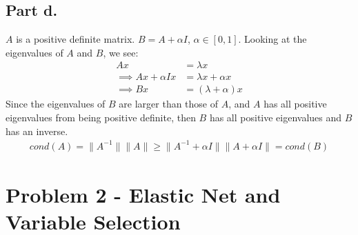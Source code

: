 \documentclass[12pt]{article}
\begin{document}
\subsection*{Part d.}
$A$ is a positive definite matrix. $B = A + \alpha I$, $\alpha \in [0,1]$. Looking at the eigenvalues of $A$ and $B$, we see:
\begin{align*}
Ax &= \lambda x \\
\implies Ax + \alpha I x &= \lambda x + \alpha x \\
\implies Bx &= (\lambda + \alpha)x
\end{align*}
Since the eigenvalues of $B$ are larger than those of $A$, and $A$ has all positive eigenvalues from being positive definite, then $B$ has all positive eigenvalues and $B$ has an inverse.
\begin{align*}
cond(A) = \|A^{-1}\|\|A\| \geq \|A^{-1} + \alpha I\| \|A + \alpha I\| = cond(B)
\end{align*}

\section*{Problem 2 - Elastic Net and Variable Selection}
\end{document}
